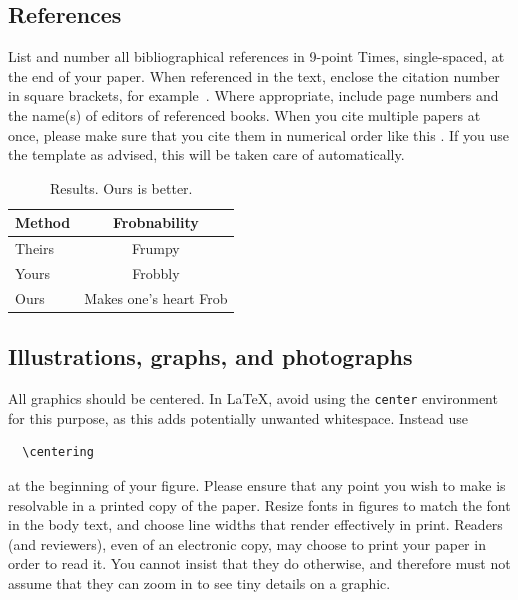 \documentclass[10pt,twocolumn,letterpaper]{article}
\begin{document}
\subsection{References}

List and number all bibliographical references in 9-point Times, single-spaced, at the end of your paper.
When referenced in the text, enclose the citation number in square brackets, for
example~\cite{Authors14}.
Where appropriate, include page numbers and the name(s) of editors of referenced books.
When you cite multiple papers at once, please make sure that you cite them in numerical order like this \cite{Alpher02,Alpher03,Alpher05,Authors14b,Authors14}.
If you use the template as advised, this will be taken care of automatically.

\begin{table}
  \centering
  \begin{tabular}{@{}lc@{}}
    \toprule
    Method & Frobnability \\
    \midrule
    Theirs & Frumpy \\
    Yours & Frobbly \\
    Ours & Makes one's heart Frob\\
    \bottomrule
  \end{tabular}
  \caption{Results.   Ours is better.}
  \label{tab:example}
\end{table}

\subsection{Illustrations, graphs, and photographs}

All graphics should be centered.
In \LaTeX, avoid using the \texttt{center} environment for this purpose, as this adds potentially unwanted whitespace.
Instead use
{\small\begin{verbatim}
  \centering
\end{verbatim}}
at the beginning of your figure.
Please ensure that any point you wish to make is resolvable in a printed copy of the paper.
Resize fonts in figures to match the font in the body text, and choose line widths that render effectively in print.
Readers (and reviewers), even of an electronic copy, may choose to print your paper in order to read it.
You cannot insist that they do otherwise, and therefore must not assume that they can zoom in to see tiny details on a graphic.
\end{document}
